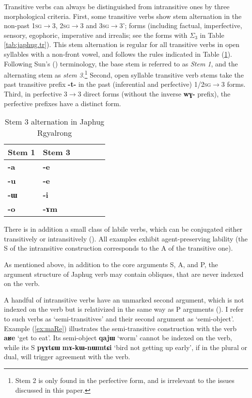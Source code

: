 \documentclass[oneside,a4paper,11pt]{article}
\newcommand{\ipa}[1]{{\phon\textbf{\mbox{#1}}}} %
\newcommand{\refb}[1]{(\ref{#1})}
\newcommand{\sigc}{$\Sigma_3$}
\begin{document}
Transitive verbs can always be distinguished from intransitive ones by three morphological criteria. First, some transitive verbs show stem alternation in the non-past \textsc{1sg}$\rightarrow$3, \textsc{2sg}$\rightarrow$3 and \textsc{3sg}$\rightarrow$3'; forms (including factual, imperfective, sensory, egophoric, imperative and irrealis; see the forms with \sigc{} in Table \ref{tab:japhug.tr}). This stem alternation is regular for all transitive verbs in open syllables with a non-front vowel, and follows the rules indicated  in Table \refb{tab:stem3}. Following Sun's (\citeyear{jackson00puxi}) terminology, the base stem is referred to as \textit{Stem 1}, and the alternating stem as \textit{stem 3}.\footnote{Stem 2 is only found in the perfective form, and is irrelevant to the issues discussed in this paper.}  Second, open syllable transitive verb stems take the past transitive prefix \ipa{-t-} in the past (inferential and perfective) \textsc{1/2sg}$\rightarrow$3 forms.  Third, in perfective 3$\rightarrow$3 direct forms (without the inverse \ipa{wɣ-} prefix), the perfective prefixes have a distinct form.

 \begin{table}[H]
\caption{Stem 3 alternation in Japhug Rgyalrong} \label{tab:stem3} \centering
\begin{tabular}{llllll}
\toprule
Stem 1 & Stem 3 \\
\midrule
\ipa{-a} & \ipa{-e} \\
\ipa{-u} & \ipa{-e} \\
\ipa{-ɯ} & \ipa{-i} \\
\ipa{-o} & \ipa{-ɤm} \\
\bottomrule
\end{tabular}
\end{table}

There is in addition a small class of labile verbs, which can be conjugated either transitively or intransitively (\citealt{jacques12demotion}). All examples exhibit agent-preserving  lability (the S of the intransitive construction corresponds to the A of the transitive one).
  
As mentioned above, in addition to the core arguments S, A, and P, the argument structure of Japhug verb may contain obliques, that are never indexed on the verb.
  
A handful of intransitive verbs have an unmarked second argument, which is not indexed on the verb but is relativized in the same way as P arguments (\citealt{jacques16relatives}). I refer to such verbs as `semi-transitives' and their second argument as `semi-object'.  Example \refb{ex:maRe} illustrates the semi-transitive construction with the verb \ipa{aʁe} `get to eat'. Its semi-object \ipa{qajɯ} `worm' cannot be indexed on the verb, while its S \ipa{pɣɤtɕɯ}  	\ipa{mɤ-kɯ-nɯmtɕi}  `bird not getting up early', if in the plural or dual, will trigger agreement with the verb.
  
\end{document}
